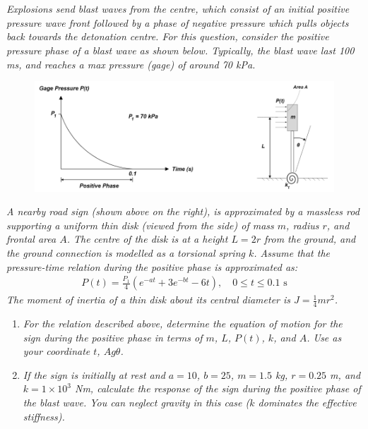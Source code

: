 \section{}
\textit{Explosions send blast waves from the centre, which consist of an initial positive pressure wave front followed by a phase of negative pressure which pulls objects back towards the detonation centre. For this question, consider the positive pressure phase of a blast wave as shown below. Typically, the blast wave last 100 ms, and reaches a max pressure (gage) of around 70 kPa.}
\begin{figure}[H]
    \centering
    \includegraphics[width=0.7\linewidth]{Questions/Figures/Q3 Problem Diagram.png}
\end{figure}
\textit{A nearby road sign (shown above on the right), is approximated by a massless rod supporting a uniform thin disk (viewed from the side) of mass $m$, radius $r$, and frontal area $A$. The centre of the disk is at a height $L = 2r$ from the ground, and the ground connection is modelled as a torsional spring $k$. Assume that the pressure-time relation during the positive phase is approximated as:}
\begin{align*}
    P(t) = \frac{P_1}{4} \left(e^{-at} + 3e^{-bt} - 6t\right), \quad 0 \leq t \leq 0.1 \text{ s}
\end{align*}
\textit{The moment of inertia of a thin disk about its central diameter is $J = \frac{1}{4} m r^2$.}
\begin{enumerate}[label=(\alph*)]
    \item \textit{For the relation described above, determine the equation of motion for the sign during the positive phase in terms of $m$, $L$, $P(t)$, $k$, and $A$. Use as your coordinate $t$, $A g \theta$.}
    \item \textit{If the sign is initially at rest and $a = 10$, $b = 25$, $m = 1.5$ kg, $r = 0.25$ m, and $k = 1 \times 10^3$ Nm, calculate the response of the sign during the positive phase of the blast wave. You can neglect gravity in this case ($k$ dominates the effective stiffness).}
\end{enumerate}

